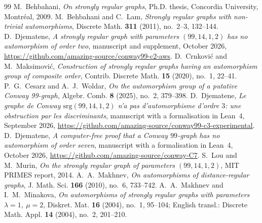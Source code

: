 \documentclass[11pt]{amsart}
\theoremstyle{remark}
\begin{document}
\begin{thebibliography}{99}
 M.~Behbahani, \emph{On strongly regular graphs}, Ph.D. thesis, Concordia University, Montr\'eal, 2009.
 M.~Behbahani and C.~Lam, \emph{Strongly regular graphs with non-trivial automorphisms}, Discrete Math.
\textbf{311} (2011), no.~2--3, 132--144.
 D.~Djematene, \emph{A strongly regular graph with parameters $(99,14,1,2)$
has no automorphism of order two}, manuscript and supplement, October 2026,
\url{https://github.com/amazing-source/conway99-c2-aws}.
 D.~Crnkovi\'c and M.~Maksimovi\'c, \emph{Construction of strongly regular graphs having an automorphism
group of composite order}, Contrib. Discrete Math. \textbf{15} (2020), no.~1, 22--41.
 P.~G.~Cesarz and A.~J.~Woldar, \emph{On the automorphism group of a putative Conway 99-graph}, Algebr.
Comb. \textbf{8} (2025), no.~2, 379--398.
 D.~Djematene, \emph{Le graphe de Conway $\mathrm{srg}(99,14,1,2)$ n'a pas
d'automorphisme d'ordre $3$: une obstruction par les discriminants}, manuscript with a formalisation in Lean~4, September
2026, \url{https://github.com/amazing-source/conway99-c3-experimental}.
 D.~Djematene, \emph{A computer-free proof that a Conway $99$-graph has no
automorphism of order seven}, manuscript with a formalisation in Lean~4, October 2026,
\url{https://github.com/amazing-source/conway-C7}.
 S.~Lou and M.~Murin, \emph{On the strongly regular graph of parameters $(99,14,1,2)$}, MIT PRIMES
report, 2014.
 A.~A.~Makhnev, \emph{On automorphisms of distance-regular graphs}, J. Math. Sci. \textbf{166} (2010),
no.~6, 733--742.
 A.~A.~Makhnev and I.~M.~Minakova, \emph{On automorphisms of strongly regular graphs with parameters
$\lambda=1$, $\mu=2$}, Diskret. Mat. \textbf{16} (2004), no.~1, 95--104; English transl.: Discrete Math. Appl. \textbf{14}
(2004), no.~2, 201--210.
\end{thebibliography}
\end{document}
